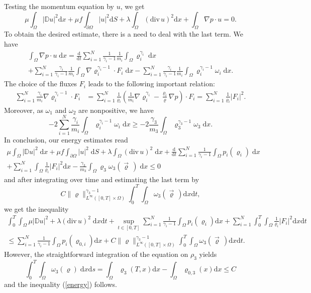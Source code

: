 \documentclass[11pt]{article}
\newcommand{\dd}{\mathrm{d}}
\newcommand{\ddiv}{\mathrm{div\,}}
\numberwithin{equation}{section}
\numberwithin{tw}{section}
\begin{document}
 Testing the momentum equation by $u$, we get
 \[ \mu\int_\Omega |\mathbb{D} u|^2\dd x + \mu f\int_{\partial\Omega}|u|^2\dd S + \lambda\int_\Omega (\ddiv u)^2\dd x + \int_\Omega \nabla p\cdot u =0. \]
 To obtain the desired estimate, there is a  need to deal with the last term. We have
 \begin{multline*} \int_\Omega \nabla p\cdot u \;\dd x =  \frac{\dd}{\dd t}\sum_{i=1}^N\frac{1}{\gamma_i-1}\frac{1}{m_i}\int_\Omega \varrho_i^{\gamma_i} \;\dd x \\
 +\sum_{i=1}^N\frac{\gamma_i}{\gamma_i-1}\frac{1}{m_i}\int_\Omega\nabla\varrho_i^{\gamma_i-1}\cdot F_i\;\dd x -\sum_{i=1}^N\frac{\gamma_i}{\gamma_i-1}\frac{1}{m_i}\int_\Omega \varrho_i^{\gamma_i-1}\omega_i \;\dd x.  \end{multline*}
 The choice of the fluxes $F_i$ leads to the following important relation:
 \begin{equation}\label{F_i}
\begin{aligned} \sum_{i=1}^N  \frac{\gamma_i}{m_i}\nabla\varrho_i^{\gamma_i-1}\cdot F_i &=
\sum_{i=1}^N \frac{1}{\varrho_i}\left(\frac{1}{m_i}\nabla\varrho_i^{\gamma_i}-\frac{\varrho_i}{\varrho}\nabla p\right)\cdot F_i
= \sum_{i=1}^N \frac{1}{\varrho_i}|F_i|^2.
\end{aligned} \end{equation}
 Moreover, as $\omega_1$ and $\omega_2$ are nonpositive, we have
 \[ -2\sum_{i=1}^N\frac{\gamma_i}{m_i}\int_\Omega \varrho_i^{\gamma_i-1}\omega_i \;\dd x \geq -2\frac{\gamma_3}{m_3}\int_\Omega \varrho_3^{\gamma_3-1}\omega_3 \;\dd x. \]
 In conclusion, our energy estimates read
 \begin{multline*}
 \mu\int_\Omega |\mathbb{D} u|^2 \;\dd x +\mu f\int_{\partial\Omega} |u|^2\;\dd S + \lambda\int_\Omega (\ddiv u)^2 \;\dd x + \frac{\dd}{\dd t}\sum_{i=1}^N\frac{1}{\gamma_i-1}\int_\Omega p_i(\varrho_i)\;\dd x \\
 +\sum_{i=1}^N \int_\Omega \frac{1}{\varrho_i}|F_i|^2 \dd x - \frac{\gamma_3}{m_3}\int_\Omega \varrho_3\omega_3(\vec\varrho\,) \;\dd x \leq 0 \end{multline*}
 and after integrating over time and estimating the last term by 
 \[ C\|\varrho\|_{L^\infty([0,T]\times\Omega)}^{\gamma_3-1}\int_0^T\int_\Omega \omega_3(\vec\varrho\,)\dd x\dd t, \]
 we get the inequality \begin{multline*} \int_0^T\int_\Omega 
\mu|\mathbb{D} u|^2 + \lambda(\ddiv u)^2\;\dd x\dd t + \sup_{t\in [0,T]}\sum_{i=1}^N\frac{1}{\gamma_i-1}\int_\Omega p_i(\varrho_i)\dd x + \sum_{i=1}^N \int_0^T\int_\Omega \frac{1}{\varrho_i}|F_i|^2 \dd x\dd t \\
\leq \sum_{i=1}^N\frac{1}{\gamma_i-1}\int_\Omega p_i(\varrho_{0,i})\dd x + C\|\varrho\|_{L^\infty([0,T]\times\Omega)}^{\gamma_3-1}\int_0^T\int_\Omega \omega_3(\vec\varrho\,)\dd x\dd t. \end{multline*}
However, the straightforward integration of the equation on $\rho_3$ yields
 \[ \int_0^T\int_\Omega \omega_3(\varrho)\;\dd x\dd s = \int_\Omega \varrho_3(T,x)\dd x - \int_\Omega \varrho_{0,3}(x)\dd x \leq C \]
 and the inequality (\ref{energy}) follows.
\end{document}
